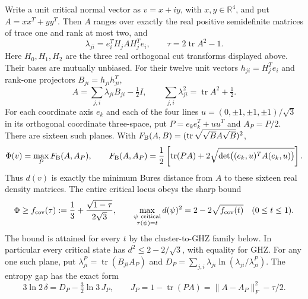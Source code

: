 \begin{lemma}
\label{lem:fqe-critical-real-density}
Write a unit critical normal vector as $v=x+iy$, with $x,y\in\mathbb R^4$,
and put $A=xx^T+yy^T$. Then $A$ ranges over exactly the real positive
semidefinite matrices of trace one and rank at most two, and
\begin{equation}\label{eq:fqe-critical-density-measurements}
 \lambda_{ji}=e_i^TH_jAH_j^Te_i,\qquad
 \tau=2\operatorname{tr}A^2-1.
\end{equation}
Here $H_0,H_1,H_2$ are the three real orthogonal cut transforms displayed
above. Their bases are mutually unbiased. For their twelve unit vectors
$h_{ji}=H_j^Te_i$ and rank-one projectors $B_{ji}=h_{ji}h_{ji}^T$,
\begin{equation}\label{eq:fqe-critical-real-tomography}
 A=\sum_{j,i}\lambda_{ji}B_{ji}-\tfrac12I,\qquad
 \sum_{j,i}\lambda_{ji}^2=\operatorname{tr}A^2+\tfrac12.
\end{equation}
For each coordinate axis $e_k$ and each of the four lines
$u=(0,\pm1,\pm1,\pm1)/\sqrt3$ in its orthogonal coordinate three-space,
put $P=e_ke_k^T+uu^T$ and $A_P=P/2$. There are sixteen such planes.
With $F_{\rm B}(A,B)=(\operatorname{tr}\sqrt{\sqrt B A\sqrt B})^2$,
\begin{equation}\label{eq:fqe-critical-bures-orbit}
 \Phi(v)=\max_P F_{\rm B}(A,A_P),\qquad
 F_{\rm B}(A,A_P)=\frac12\left[\operatorname{tr}(PA)
                    +2\sqrt{\det\bigl((e_k,u)^TA(e_k,u)\bigr)}\right].
\end{equation}
Thus $d(v)$ is exactly the minimum Bures distance from $A$ to these
sixteen real density matrices. The entire critical locus obeys the sharp bound
\begin{equation}\label{eq:fqe-critical-fidelity-floor}
 \Phi\ge f_{\rm cov}(\tau):=
       \frac13+\frac{\sqrt{1-\tau}}{2\sqrt3},\qquad
 \max_{\substack{\psi\ {\rm critical}\\\tau(\psi)=t}}d(\psi)^2
       =2-2\sqrt{f_{\rm cov}(t)}\quad(0\le t\le1).
\end{equation}
The bound is attained for every $t$ by the cluster-to-GHZ family below.
In particular every critical state has $d^2\le2-2/\sqrt3$, with equality for GHZ.
For any one such plane, put
$\lambda^P_{ji}=\operatorname{tr}(B_{ji}A_P)$ and
$D_P=\sum_{j,i}\lambda_{ji}\ln(\lambda_{ji}/\lambda^P_{ji})$.
The entropy gap has the exact form
\begin{equation}\label{eq:fqe-critical-relative-entropy}
 3\ln2\,\delta=D_P-\tfrac32\ln3\,J_P,\qquad
 J_P=1-\operatorname{tr}(PA)
    =\|A-A_P\|_F^2-\tau/2.
\end{equation}
\end{lemma}

